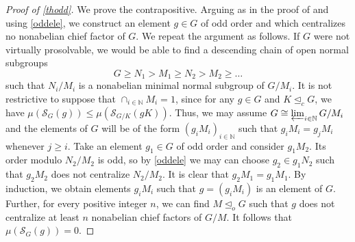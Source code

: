 \documentclass{amsart}
\numberwithin{equation}{section}
\begin{document}

\begin{proof}[Proof of \cref{thodd}]
We prove the contrapositive. Arguing as in the proof of \cite[Corollary 22]{pel} and using \cref{oddele}, we construct an element $g\in G$ of odd order and which centralizes no nonabelian chief factor of $G$. We repeat the argument as follows. If $G$ were not virtually prosolvable, we would be able to find a descending chain of open normal subgroups
\[G \geq N_1 > M_1 \geq N_2 > M_2 \geq \ldots\]
such that $N_i/M_i$ is a nonabelian minimal normal subgroup of $G/M_i$. It is not restrictive to suppose that $\cap_{i\in \mathbb N} M_i = 1$, since for any $g \in G$ and $K\unlhd_c G$, we have $\mu(\mathcal S_G(g)) \leq \mu(\mathcal S_{G/K}(gK))$. Thus, we may assume $G \cong \varprojlim_{i \in \mathbb N} G/M_i$ and the elements of $G$ will be of the form $(g_iM_i)_{i \in \mathbb N}$ such that $g_iM_i = g_jM_i$ whenever $j\geq i$. Take an element $g_1 \in G$ of odd order and consider $g_1M_2$. Its order modulo $N_2/M_2$ is odd, so by \cref{oddele} we may can choose $g_2 \in g_1N_2$ such that $g_2M_2$ does not centralize $N_2/M_2$. It is clear that $g_2 M_1 = g_1M_1$. By induction, we obtain elements $g_iM_i$ such that $g=(g_iM_i)$ is an element of $G$. Further, for every positive integer $n$, we can find $M\unlhd_o G$ such that 
$g$ does not centralize at least $n$ nonabelian chief factors of $G/M$. It follows that $\mu(\mathcal S_G(g))=0$.
\end{proof}


\end{document}
